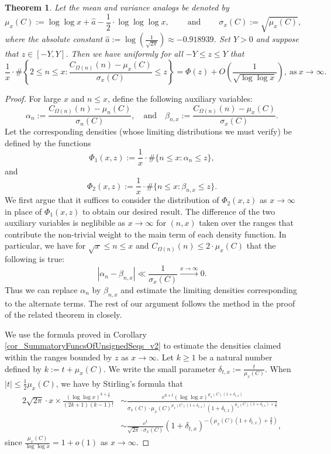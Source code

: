 \documentclass[11pt,reqno,a4letter]{article}
\numberwithin{figure}{section}
\numberwithin{table}{section}
\theoremstyle{plain}
\newtheorem{theorem}{Theorem}
\numberwithin{theorem}{section}
\theoremstyle{definition}
\begin{document}
\begin{theorem} 
\label{theorem_CLT_VI} 
Let the mean and variance analogs be denoted by 
\[
\mu_x(C) := \log\log x + \hat{a} - \frac{1}{2} \cdot \log\log\log x, 
     \qquad \mathrm{\ and\ } \qquad 
     \sigma_x(C) := \sqrt{\mu_x(C)}, 
\]
where the absolute constant 
$\hat{a} := \log\left(\frac{1}{\sqrt{2\pi}}\right) \approx -0.918939$. 
Set $Y > 0$ and suppose that $z \in [-Y, Y]$. Then we have 
uniformly for all $-Y \leq z \leq Y$ that 
\[
\frac{1}{x} \cdot \#\left\{2 \leq n \leq x: 
     \frac{C_{\Omega(n)}(n) - \mu_x(C)}{\sigma_x(C)} \leq z\right\} = 
     \Phi(z) + O\left(\frac{1}{\sqrt{\log\log x}}\right), 
     \mathrm{\ as\ } x \rightarrow \infty. 
\] 
\end{theorem} 
\begin{proof} 
For large $x$ and $n \leq x$, define the following auxiliary variables: 
\[
\alpha_n := \frac{C_{\Omega(n)}(n) - \mu_n(C)}{\sigma_n(C)}, \quad\mathrm{and}\quad 
     \beta_{n,x} := \frac{C_{\Omega(n)}(n) - \mu_x(C)}{\sigma_x(C)}. 
\] 
Let the corresponding densities (whose limiting distributions we must verify) 
be defined by the functions 
\[
\Phi_1(x, z) := \frac{1}{x} \cdot \#\{n \leq x: \alpha_n \leq z\}, 
\]
and 
\[
\Phi_2(x, z) := \frac{1}{x} \cdot \#\{n \leq x: \beta_{n,x} \leq z\}. 
\] 
We first argue that it suffices to consider the distribution of $\Phi_2(x, z)$ as 
$x \rightarrow \infty$ in place of $\Phi_1(x, z)$ to obtain our desired result. 
The difference of the two auxiliary variables is neglibible as 
$x \rightarrow \infty$ for $(n,x)$ taken over the ranges that contribute the non-trivial 
weight to the main term of each density function. In particular, we have for 
$\sqrt{x} \leq n \leq x$ and $C_{\Omega(n)}(n) \leq 2 \cdot \mu_x(C)$ that the 
following is true: 
\[
|\alpha_n - \beta_{n,x}| \ll \frac{1}{\sigma_x(C)} \xrightarrow{x \rightarrow \infty} 0. 
\]
Thus we can replace $\alpha_n$ by $\beta_{n,x}$ and estimate the limiting 
densities corresponding to the alternate terms. 
The rest of our argument follows the method in the proof of the related theorem in 
\cite[Thm.\ 7.21; \S 7.4]{MV} closely. 

We use the formula proved in Corollary \ref{cor_SummatoryFuncsOfUnsignedSeqs_v2} 
to estimate the densities claimed within the ranges bounded by 
$z$ as $x \rightarrow \infty$. 
Let $k \geq 1$ be a natural number defined by $k := t + \mu_x(C)$. 
We write the small parameter $\delta_{t,x} := \frac{t}{\mu_x(C)}$. 
When $|t| \leq \frac{1}{2} \mu_x(C)$, we have by Stirling's formula that 
\begin{align*} 
2\sqrt{2\pi} \cdot x \times 
     \frac{(\log\log x)^{k+\frac{1}{2}}}{(2k+1)(k-1)!} & \sim 
     \frac{e^{\hat{a} + t} 
     (\log\log x)^{\mu_x(C)(1+\delta_{t,x})}}{ 
     \sigma_x(C) \cdot \mu_x(C)^{\mu_x(C) (1 + \delta_{t,x})}
     (1 + \delta_{t,x})^{\mu_x(C) (1 + \delta_{t,x}) + \frac{3}{2}}} \\ 
     & \sim \frac{e^{t}}{\sqrt{2\pi} \cdot \sigma_x(C)} (1 + \delta_{t,x})^{-\left( 
     \mu_x(C) (1 + \delta_{t,x}) + \frac{3}{2}\right)}, 
\end{align*} 
since $\frac{\mu_x(C)}{\log\log x} = 1 + o(1)$ as $x \rightarrow \infty$. 


\end{proof}
\end{document}
